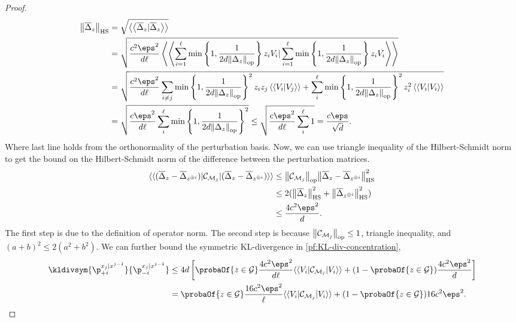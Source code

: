 \begin{proof}
\begin{align*}
\hsnorm{\barDelta_{z}} &= \sqrt{\vvdotprod{\barDelta_{z}}{\barDelta_{z}}} \\
&= \sqrt{\frac{c^2\eps^2}{\dims \ell}\vvdotprod{\sum_{i=1}^\ell \min\left\{1, \frac{1}{2\dims \opnorm{\Delta_{\ptb}}}\right\} z_i V_i}{\sum_{i=1}^\ell \min\left\{1, \frac{1}{2\dims \opnorm{\Delta_{\ptb}}}\right\} z_i V_i}}\\
&= \sqrt{\frac{c^2 \eps^2}{\dims \ell} \sum_{i \neq j} \min\left\{1, \frac{1}{2\dims \opnorm{\Delta_{\ptb}}}\right\}^2 z_i z_j \vvdotprod{V_i}{V_j} + \sum_{i}^\ell \min\left\{1, \frac{1}{2\dims \opnorm{\Delta_{\ptb}}}\right\}^2 z_i^2 \vvdotprod{V_i}{V_i}} \\
&= \sqrt{\frac{c\eps^2}{\dims \ell} \sum_{i}^\ell \min\left\{1, \frac{1}{2\dims \opnorm{\Delta_{\ptb}}}\right\}^2} \leq  \sqrt{\frac{c\eps^2}{\dims \ell} \sum_{i}^\ell 1} = \frac{c \eps}{\sqrt{\dims}}.
\end{align*} 
Where last line holds from the orthonormality of the perturbation basis. Now, we can use triangle inequality of the Hilbert-Schmidt norm to get the bound on the Hilbert-Schmidt norm of the difference between the perturbation matrices.
\begin{align*}
    \vadj{(\barDelta_{z} - \barDelta_{z ^{\oplus i}})} \Choi_{\POVM_j} \vvec{(\barDelta_{z} - \barDelta_{z ^{\oplus i}})} 
    &\le \opnorm{\Choi_{\POVM_j}}\hsnorm{\barDelta_{z} - \barDelta_{z ^{\oplus i}}}^2  \\
    &\leq 2(\hsnorm{\barDelta_{z}}^2 + \hsnorm{\barDelta_{z ^{\oplus i}}}^2) \\
    &\leq \frac{4c^2 \eps^2}{\dims}.
\end{align*}
The first step is due to the definition of operator norm. The second step is because ${\left\|{\mathcal{C}}_{\mathcal{M}_j}\right\|}_{\text{op}} \le 1$, triangle inequality, and $(a+b)^2\le 2(a^2+b^2)$. We can further bound the symmetric KL-divergence in \cref{pf:KL-div-concentration},
 \begin{align*}
     \kldivsym{\p^{\out_{j}|\out^{j-1}}_{+i}}{\p^{\out_{j}|\out^{j-1}}_{-i}} &\le 4 \dims \left[\probaOf{z \in \mathcal{G}} \frac{4 c^2 \eps^2}{\dims\ell} \vadj{V_i} \Choi_{\POVM_j} \vvec{V_i} + (1 - \probaOf{z \in \mathcal{G}})   \frac{4 c^2 \eps^2}{\dims}\right] \\
     &= \probaOf{z \in \mathcal{G}} \frac{16 c^2 \eps^2}{\ell} \vadj{V_i} \Choi_{\POVM_j} \vvec{V_i} + (1-\probaOf{z \in \mathcal{G}}) 16 c^2 \eps^2.
 \end{align*} 


\end{proof}
